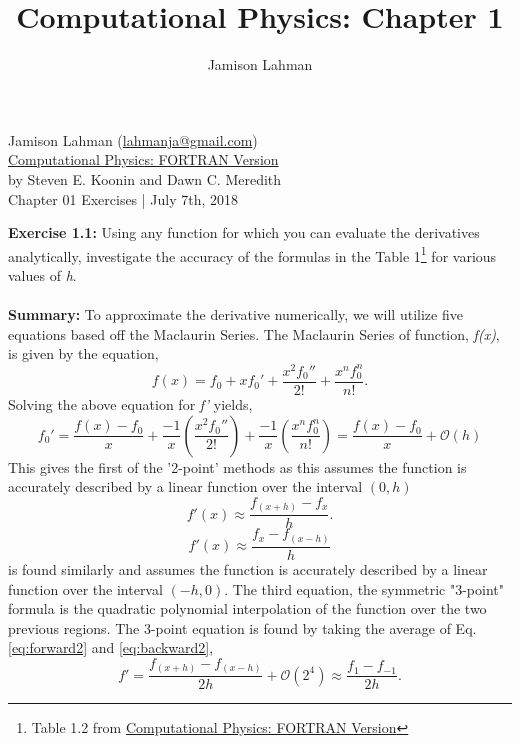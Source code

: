 \documentclass[10pt]{article}
\author{Jamison Lahman}
\title{Computational Physics: Chapter 1}
\begin{document}
\begin{flushright}Jamison Lahman (\href{mailto:lahmanja@gmail.com}{lahmanja@gmail.com}) \\
\href{https://www.amazon.com/Computational-Physics-Fortran-Steven-Koonin/dp/0201386232}{Computational Physics: FORTRAN Version} \\
by Steven E. Koonin and Dawn C. Meredith\\
Chapter 01 Exercises | July 7th, 2018 \\
\end{flushright}
\textbf{Exercise 1.1:} Using any function for which you can evaluate the derivatives analytically, investigate the accuracy of the formulas in the Table 1\footnote{Table 1.2 from \href{https://www.amazon.com/Computational-Physics-Fortran-Steven-Koonin/dp/0201386232}{Computational Physics: FORTRAN Version}} for various values of \textit{h}. \\
\\
\textbf{Summary:} To approximate the derivative numerically, we will utilize five equations based off the Maclaurin Series. The Maclaurin Series of function, \textit{f(x)}, is given by the equation,
\begin{equation}
f(x) = f_0 +x f_0'+ \frac{x^2f_0''}{2!} + \frac{x^nf_0^n}{n!}.
\end{equation}
Solving the above equation for \textit{f'} yields,
\begin{equation}
f_0' = \frac{f(x)-f_0}{x}+\frac{-1}{x}\left(\frac{x^2f_0''}{2!} \right)+ \frac{-1}{x} \left(\frac{x^nf_0^n}{n!}\right) =  \frac{f(x)-f_0}{x}  + \mathcal{O}(h)
\end{equation}
This gives the first of the '2-point' methods as this assumes the function is accurately described by a linear function over the interval $(0,h)$
\begin{equation}
\label{eq:forward2}
f'(x) \approx \frac{f_{(x+h)}-f_x}{h}.
\end{equation}
\begin{equation}
\label{eq:backward2}
f'(x) \approx \frac{f_{x}-f_{(x-h)}}{h}
\end{equation}
is found similarly and assumes the function is accurately described by a linear function over the interval $(-h,0)$. The third equation, the symmetric "3-point" formula is the quadratic polynomial interpolation of the function over the two previous regions. The 3-point equation is found by taking the average of Eq. \ref{eq:forward2} and \ref{eq:backward2},
\begin{equation}
\label{eq:symmetric3}
f'=\frac{f_{(x+h)}-f_{(x-h)}}{2h} + \mathcal{O}(2^4) \approx \frac{f_1-f_{-1}}{2h}.
\end{equation} 
\end{document}
